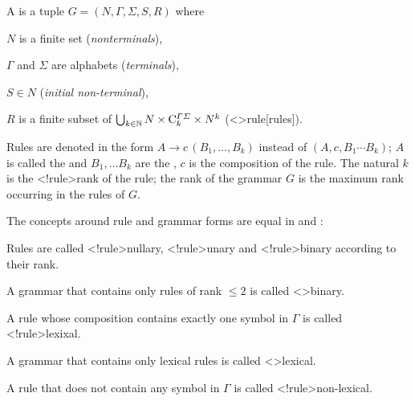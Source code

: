 \documentclass[../document.tex]{subfiles}
\begin{document}
    \begin{definition}
        A %
        is a tuple \(G=(N, \varGamma, \varSigma, S, R)\) where
        \begin{compactenum}[(i)]
            \item \(N\) is a finite set (\emph{nonterminals}),
            \item \(\varGamma\) and \(\varSigma\) are alphabets (\emph{terminals}),
            \item \(S \in N\) (\emph{initial non-terminal}),
            \item \(R\) is a finite subset of \(\bigcup_{k \in \mathbb{N}} N \times \mathrm{C}^{\varGamma\varSigma}_k \times N^k\) (<\dcp>{rule}[rules]). %
        \end{compactenum}

        Rules are denoted in the form \(A \to c\,(B_1, \ldots, B_k)\) instead of \((A, c, B_1 \cdots B_k)\); \(A\) is called the  and \(B_1, \ldots B_k\) are the , \(c\) is the composition of the rule.
        The natural \(k\) is the <\dcp!rule>{rank} of the rule; the rank of the grammar \(G\) is the maximum rank occurring in the rules of \(G\).
    \end{definition}

    \begin{definition}
        The concepts around rule and grammar forms are equal in  and :
        \begin{compactitem}
            \item Rules are called <\dcp!rule>{nullary}, <\dcp!rule>{unary} and <\dcp!rule>{binary} according to their rank.
            \item A grammar that contains only rules of rank \(\leq 2\) is called <\dcp>{binary}.
            \item A rule whose composition contains exactly one symbol in \(\varGamma\) is called <\dcp!rule>{lexixal}.
            \item A grammar that contains only lexical rules is called <\dcp>{lexical}.
            \item A rule that does not contain any symbol in \(\varGamma\) is called <\dcp!rule>{non-lexical}.
        \end{compactitem}
    \end{definition}
\end{document}
